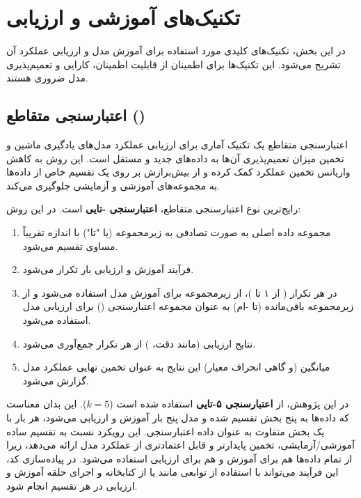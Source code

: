 \section{تکنیک‌های آموزشی و ارزیابی}
در این بخش، تکنیک‌های کلیدی مورد استفاده برای آموزش مدل  و ارزیابی عملکرد آن تشریح می‌شود. این تکنیک‌ها برای اطمینان از قابلیت اطمینان، کارایی و تعمیم‌پذیری مدل ضروری هستند.

\subsection{اعتبارسنجی متقاطع ()}
اعتبارسنجی متقاطع  یک تکنیک آماری برای ارزیابی عملکرد مدل‌های یادگیری ماشین و تخمین میزان تعمیم‌پذیری آن‌ها به داده‌های جدید و مستقل است. این روش به کاهش واریانس تخمین عملکرد کمک کرده و از بیش‌برازش  بر روی یک تقسیم خاص از داده‌ها به مجموعه‌های آموزشی و آزمایشی جلوگیری می‌کند.

رایج‌ترین نوع اعتبارسنجی متقاطع، \textbf{اعتبارسنجی {-تایی} } است. در این روش:
\begin{enumerate}
    \renewcommand{\labelitemi}{\lr{$\bullet$}}
    \item مجموعه داده اصلی به صورت تصادفی به  زیرمجموعه (یا "تا") با اندازه تقریباً مساوی تقسیم می‌شود.
    \item فرآیند آموزش و ارزیابی  بار تکرار می‌شود.
    \item در هر تکرار ( از ۱ تا )، از  زیرمجموعه برای آموزش مدل استفاده می‌شود و از زیرمجموعه باقی‌مانده (تا -ام) به عنوان مجموعه اعتبارسنجی () برای ارزیابی مدل استفاده می‌شود.
    \item نتایج ارزیابی (مانند دقت، ) از هر  تکرار جمع‌آوری می‌شود.
    \item میانگین (و گاهی انحراف معیار) این نتایج به عنوان تخمین نهایی عملکرد مدل گزارش می‌شود.
\end{enumerate}
در این پژوهش، از \textbf{اعتبارسنجی ۵-تایی } استفاده شده است (\(k=5\)). این بدان معناست که داده‌ها به پنج بخش تقسیم شده و مدل پنج بار آموزش و ارزیابی می‌شود، هر بار با یک بخش متفاوت به عنوان داده اعتبارسنجی. این رویکرد نسبت به تقسیم ساده آموزشی/آزمایشی، تخمین پایدارتر و قابل اعتمادتری از عملکرد مدل ارائه می‌دهد، زیرا از تمام داده‌ها هم برای آموزش و هم برای ارزیابی استفاده می‌شود. در پیاده‌سازی کد، این فرآیند می‌تواند با استفاده از توابعی مانند  یا  از کتابخانه  و اجرای حلقه آموزش و ارزیابی در هر تقسیم انجام شود.

